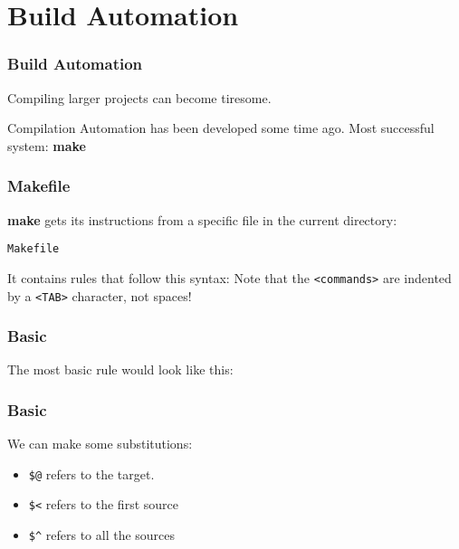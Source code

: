\section{Build Automation}
\begin{frame}
    \frametitle{Build Automation}
    Compiling larger projects can become tiresome.

    Compilation Automation has been developed some time ago. 
    Most successful system: \textbf{make}
\end{frame}


\begin{frame}
    \frametitle{Makefile}
    \textbf{make} gets its instructions from a specific file in the current directory:

    \texttt{Makefile}

    It contains rules that follow this syntax:
\Lst
    Note that the \texttt{<commands>} are indented by a \texttt{<TAB>} character, not spaces!
\end{frame}


\begin{frame}
    \frametitle{Basic}
    The most basic rule would look like this:
\LstBasic
\end{frame}


\begin{frame}
    \frametitle{Basic}
    We can make some substitutions:
    \begin{itemize}
        \item \texttt{\$@} refers to the target.
        \item \texttt{\$<} refers to the first source
        \item \texttt{\$\^{ }} refers to all the sources
    \end{itemize}
\LstRef
\end{frame}


